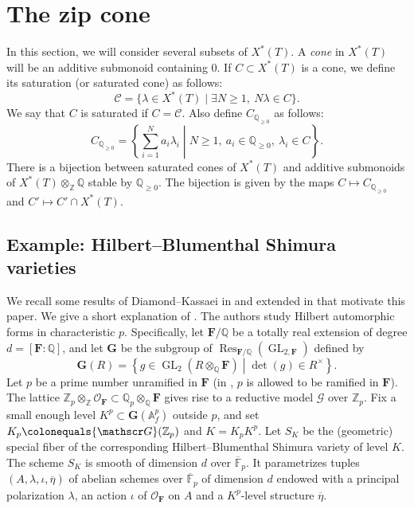 \documentclass[11pt]{amsart}
\numberwithin{equation}{section}
\theoremstyle{definition}
\theoremstyle{remark}
\newcommand{\Ccal}{{\mathcal C}}
\newcommand{\Ocal}{{\mathcal O}}
\renewcommand{\AA}{\mathbb{A}}
\newcommand{\FF}{\mathbb{F}}
\newcommand{\QQ}{\mathbb{Q}}
\newcommand{\ZZ}{\mathbb{Z}}
\newcommand{\Gscr}{{\mathscr G}}
\DeclareMathOperator{\GL}{GL}
\DeclareMathOperator{\Res}{Res}
\newcommand{\relmiddle}[1]{\mathrel{}\middle#1\mathrel{}}
\begin{document}
\section{The zip cone}\label{sec-zip-cone}

In this section, we will consider several subsets of $X^*(T)$. A \emph{cone} in $X^*(T)$ will be an additive submonoid containing $0$. If $C\subset X^*(T)$ is a cone, we define its saturation (or saturated cone) as follows: 
\begin{equation}
\Ccal = \{\lambda \in X^*(T) \mid \exists N\geq 1, \ N\lambda\in C \}.
\end{equation}
We say that $C$ is saturated if $C=\Ccal$. Also define  $C_{\QQ_{\geq 0}}$ as follows: 
\begin{equation}
C_{\QQ_{\geq 0}}=\left\{\sum_{i=1}^N a_i\lambda_i \relmiddle| N\geq 1, \ a_i\in \QQ_{\geq 0}, \ \lambda_i\in C \right\}.
\end{equation}
There is a bijection between saturated cones of $X^*(T)$ and additive submonoids of $X^*(T)\otimes_{\ZZ} \QQ$ stable by $\QQ_{\geq 0}$. The bijection is given by the maps $C\mapsto C_{\QQ_{\geq 0}}$ and $C'\mapsto C'\cap X^*(T)$.

\subsection{Example: Hilbert--Blumenthal Shimura varieties}
We recall some results of Diamond--Kassaei in \cite{Diamond-Kassaei-comp-minimal} and extended in \cite{Diamond-Kassaei-cone-minimal} that motivate this paper. We give a short explanation of \cite[Corollary 5.4]{Diamond-Kassaei-comp-minimal}. The authors study Hilbert automorphic forms in characteristic $p$. Specifically, let $\mathbf{F}/\QQ$ be a totally real extension of degree $d=[\mathbf{F}:\QQ]$, and let $\mathbf{G}$ be the subgroup of $\Res_{\mathbf{F}/\QQ}(\GL_{2,\mathbf{F}})$ defined by
\begin{equation}
    \mathbf{G}(R)=\left\{g\in \GL_2(R\otimes_\QQ \mathbf{F}) \relmiddle| \det(g)\in R^\times\right\}.
\end{equation}
Let $p$ be a prime number unramified in $\mathbf{F}$ (in \cite{Diamond-Kassaei-cone-minimal}, $p$ is allowed to be ramified in $\mathbf{F}$). The lattice $\ZZ_p\otimes_{\ZZ}\Ocal_{\mathbf{F}}\subset \QQ_p\otimes_{\QQ} \mathbf{F}$ gives rise to a reductive model $\Gscr$ over $\ZZ_p$. Fix a small enough level $K^p\subset \mathbf{G}(\AA_f^p)$ outside $p$, and set $K_p\colonequals\Gscr(\ZZ_p)$ and $K=K_pK^p$. Let $S_K$ be the (geometric) special fiber of the corresponding Hilbert--Blumenthal Shimura variety of level $K$. 
The scheme $S_K$ is smooth of dimension $d$ over $\overline{\FF}_p$. It parametrizes tuples $(A,\lambda,\iota,\overline{\eta})$ of abelian schemes over $\overline{\FF}_p$ of dimension $d$ endowed with a principal polarization $\lambda$, an action $\iota$ of $\Ocal_{\mathbf{F}}$ on $A$ and a $K^p$-level structure $\overline{\eta}$. 
\end{document}

